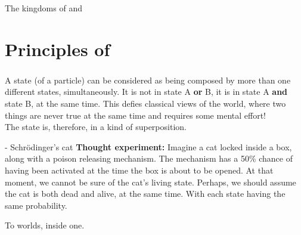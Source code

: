 \documentclass[aspectratio=43]{beamer}
\begin{document}
\begin{frame}{The kingdoms of \cl and \qm}
\begin{card}
    \centering{}
\end{card}
\pagenumber
\end{frame}

\section{Principles of \qm}
\subsubsection{\qsp}
\begin{frame}{\qsp}
    \begin{card}
        A \q state (of a particle) can be considered as being composed by more than one different states, simultaneously. It is not in state A \textbf{or} B, it is in state A \textbf{and} state B, at the same time. This defies classical views of the world, where two things are never true at the same time and requires some mental effort!\\
        The state is, therefore, in a kind of superposition.
    \end{card}
\end{frame}

\begin{frame}{\qsp - Schrödinger's cat}
    \textbf{Thought experiment:} Imagine a cat locked inside a box, along with a poison releasing mechanism. The mechanism has a 50\% chance of having been activated at the time the box is about to be opened. At that moment, we cannot be sure of the cat's living state. Perhaps, we should assume the cat is both dead and alive, at the same time. With each state having the same probability.
    \begin{center}
    \end{center}
    \begin{center}
        To worlds, inside one.
    \end{center}
\end{frame}
\end{document}
